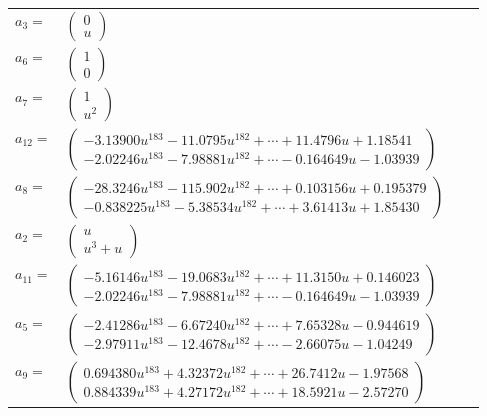 \documentclass[1p]{elsarticle_modified}
\theoremstyle{definition}
\begin{document}
\begin{tabular}{m{7pt} m{180pt} m{7pt} m{180pt} }
\flushright $a_{3}=$&$\begin{pmatrix}0\\u\end{pmatrix}$ \\
\flushright $a_{6}=$&$\begin{pmatrix}1\\0\end{pmatrix}$ \\
\flushright $a_{7}=$&$\begin{pmatrix}1\\u^2\end{pmatrix}$ \\
\flushright $a_{12}=$&$\begin{pmatrix}-3.13900 u^{183}-11.0795 u^{182}+\cdots+11.4796 u+1.18541\\-2.02246 u^{183}-7.98881 u^{182}+\cdots-0.164649 u-1.03939\end{pmatrix}$ \\
\flushright $a_{8}=$&$\begin{pmatrix}-28.3246 u^{183}-115.902 u^{182}+\cdots+0.103156 u+0.195379\\-0.838225 u^{183}-5.38534 u^{182}+\cdots+3.61413 u+1.85430\end{pmatrix}$ \\
\flushright $a_{2}=$&$\begin{pmatrix}u\\u^3+u\end{pmatrix}$ \\
\flushright $a_{11}=$&$\begin{pmatrix}-5.16146 u^{183}-19.0683 u^{182}+\cdots+11.3150 u+0.146023\\-2.02246 u^{183}-7.98881 u^{182}+\cdots-0.164649 u-1.03939\end{pmatrix}$ \\
\flushright $a_{5}=$&$\begin{pmatrix}-2.41286 u^{183}-6.67240 u^{182}+\cdots+7.65328 u-0.944619\\-2.97911 u^{183}-12.4678 u^{182}+\cdots-2.66075 u-1.04249\end{pmatrix}$ \\
\flushright $a_{9}=$&$\begin{pmatrix}0.694380 u^{183}+4.32372 u^{182}+\cdots+26.7412 u-1.97568\\0.884339 u^{183}+4.27172 u^{182}+\cdots+18.5921 u-2.57270\end{pmatrix}$ \\

\end{tabular}
\end{document}
